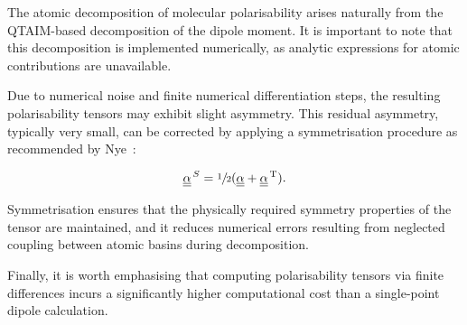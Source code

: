 The atomic decomposition of molecular polarisability arises naturally from the
QTAIM-based decomposition of the dipole moment. It is important to
note that this decomposition is implemented numerically, as analytic
expressions for atomic contributions are unavailable.

\pagebreak
Due to numerical noise and finite numerical differentiation steps, the
resulting polarisability tensors may exhibit slight asymmetry. This residual
asymmetry, typically very small, can be corrected by applying a symmetrisation
procedure as recommended by Nye~\cite{nye1985physical}:

\begin{align}
  \underline{\underline{\alpha}}^{\,S} =
    \sfrac{1}{2} (\underline{\underline{\alpha}}
    + \underline{\underline{\alpha}}^{\,\mathrm{T}}).
  \label{symmetrisation}
\end{align}

Symmetrisation ensures that the physically required symmetry properties of the
tensor are maintained, and it reduces numerical errors resulting from neglected
coupling between atomic basins during decomposition.

Finally, it is worth emphasising that computing polarisability tensors via
finite differences incurs a significantly higher computational cost than a
single-point dipole calculation.



